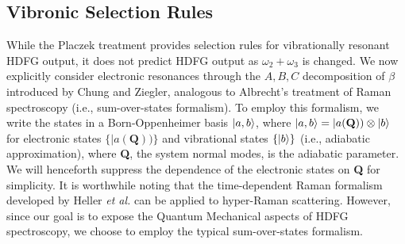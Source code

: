 \documentclass[aip, jcp, reprint, onecolumn, nofootinbib]{revtex4-2}
\begin{document}
\subsection{Vibronic Selection Rules}\label{Albrecht}
While the Placzek treatment provides selection rules for vibrationally resonant HDFG output, it does not predict HDFG output as $\omega_2 + \omega_3$ is changed.
We now explicitly consider electronic resonances through the $A,B,C$ decomposition of $\beta$ introduced by Chung and Ziegler, analogous to Albrecht's treatment of Raman spectroscopy (i.e., sum-over-states formalism).\cite{Albrecht1961, Ziegler1988} 
To employ this formalism, we write the states in a Born-Oppenheimer basis $\ket{a,b}$, where $\ket{a,b} = |a(\textbf{Q})) \otimes \ket{b}$ for electronic states $\{|a(\textbf{Q}))\}$ and vibrational states $\{\ket{b}\}$ (i.e., adiabatic approximation), where \textbf{Q}, the system normal modes, is the adiabatic parameter. \cite{BornOppenheimer, Tang1970}
We will henceforth suppress the dependence of the electronic states on \textbf{Q} for simplicity.
It is worthwhile noting that the time-dependent Raman formalism developed by Heller \textit{et al.} can be applied to hyper-Raman scattering. \cite{Lee1979, Shoute2005, Silverstein2012}
However, since our goal is to expose the Quantum Mechanical aspects of HDFG spectroscopy, we choose to employ the typical sum-over-states formalism.
\end{document}
